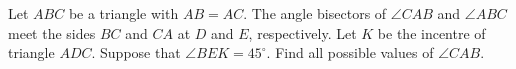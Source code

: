 Let $ABC$ be a triangle with $ AB = AC$. The angle bisectors of $ \angle C AB$ and $ \angle AB C$ meet the sides $ B C$ and $ C A$ at $ D$ and $ E$, respectively. Let $ K$ be the incentre of triangle $ ADC$. Suppose that $ \angle B E K = 45^\circ$. Find all possible values of $ \angle C AB$.
